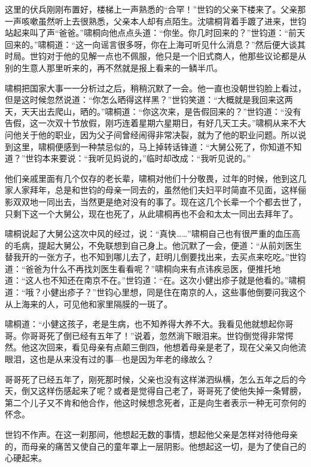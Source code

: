 \par 这里的伏兵刚刚布置好，楼梯上一声熟悉的“合罕！”世钧的父亲下楼来了。父亲那一声咳嗽虽然听上去很熟悉，父亲本人却有点陌生。沈啸桐背着手踱了进来，世钧站起来叫了声“爸爸。”啸桐向他点点头道：“你坐。你几时回来的？”世钧道：“前天回来的。”啸桐道：“这一向谣言很多呀，你在上海可听见什么消息？”然后便大谈其时局。世钧对于他的见解一点也不佩服，他只是一个旧式商人，他那些议论都是从别的生意人那里听来的，再不然就是报上看来的一鳞半爪。
\par 啸桐把国家大事一一分析过之后，稍稍沉默了一会。他一直也没朝世钧脸上看过，但是这时候忽然说道：“你怎么晒得这样黑？”世钧笑道：“大概就是我回来这两天，天天出去爬山，晒的。”啸桐道：“你这次来，是告假回来的？”世钧道：“没有告假，这一次双十节放假，刚巧连着星期六星期日，有好几天工夫。”啸桐从来不大问他关于他的职业，因为父子间曾经闹得非常决裂，就为了他的职业问题。所以说到这里，啸桐便感到一种禁忌似的，马上掉转话锋道：“大舅公死了，你知道不知道？”世钧本来要说：“我听见妈说的，”临时却改成：“我听见说的。”
\par 他们亲戚里面有几个仅存的老长辈，啸桐对他们十分敬畏，过年的时候，他到这几家人家拜年，总是和世钧的母亲一同去的，虽然他们夫妇平时简直不见面，这样俪影双双地一同出去，当然更是绝对没有的事了。现在这几个长辈一个个都去世了，只剩下这一个大舅公，现在也死了，从此啸桐再也不会和太太一同出去拜年了。
\par 啸桐说起了大舅公这次中风的经过，说：“真快……”啸桐自己也有很严重的血压高的毛病，提起大舅公，不免联想到自己身上。他沉默了一会，便道：“从前刘医生替我开的一张方子，也不知到哪儿去了，赶明儿倒要找出来，去买点来吃吃。”世钧道：“爸爸为什么不再找刘医生看看呢？”啸桐向来有点讳疾忌医，便推托地道：“这人也不知还在南京不在。”世钧道：“在。这次小健出疹子就是他看的。”啸桐道：“哦？小健出疹子？”世钧心里想，同是住在南京的人，这些事他倒要问我这个从上海来的人，可见他和家里隔膜的一斑了。
\par 啸桐道：“小健这孩子，老是生病，也不知养得大养不大。我看见他就想起你哥哥。你哥哥死了倒已经有五年了！”说着，忽然淌下眼泪来。世钧倒觉得非常愕然。他这次回来，看见母亲有点颠三倒四，他想着母亲是老了，现在父亲又向他流眼泪，这也是从来没有过的事—也是因为年老的缘故么？
\par 哥哥死了已经五年了，刚死那时候，父亲也没有这样涕泗纵横，怎么五年之后的今天，倒又这样伤感起来了呢？或者是觉得自己老了，哥哥死了使他失掉一条臂膀，第二个儿子又不肯和他合作，他这时候想念死者，正是向生者表示一种无可奈何的怀念。
\par 世钧不作声。在这一刹那间，他想起无数的事情，想起他父亲是怎样对待他母亲的，而母亲的痛苦又使自己的童年罩上一层阴影。他想起这一切，是为了使自己的心硬起来。
